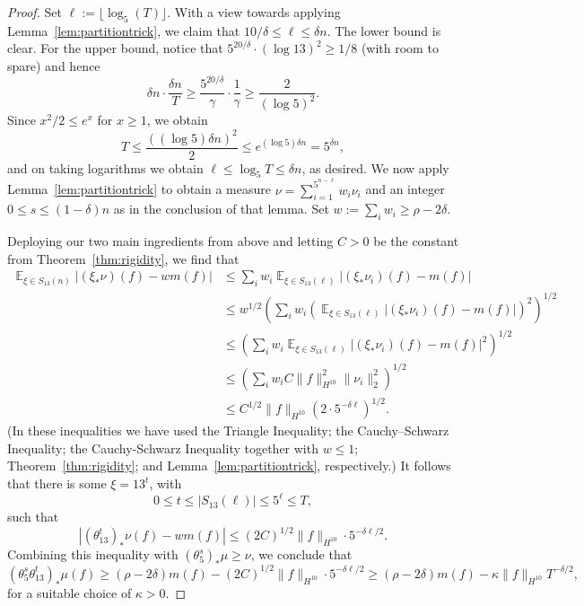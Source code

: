 \documentclass[11pt]{amsart}
\theoremstyle{definition}
\DeclareMathOperator*{\E}{\mathbb{E}}
\begin{document}
\begin{proof}
Set $\ell:=\lfloor \log_5(T) \rfloor$.  With a view towards applying Lemma~\ref{lem:partitiontrick}, we claim that $10/\delta\leq \ell \leq \delta n$.  The lower bound is clear.  For the upper bound, notice that $5^{20/\delta} \cdot (\log 13)^2 \geq 1/8$ (with room to spare) and hence
$$\delta n \cdot \frac{\delta n}{T} \geq \frac{5^{20/\delta}}{\gamma} \cdot \frac{1}{\gamma} \geq \frac{2}{(\log 5)^2}.$$
Since $x^2/2 \leq e^x$ for $x \geq 1$, we obtain
$$T \leq \frac{((\log 5) \delta n)^2}{2} \leq e^{(\log 5) \delta n}=5^{\delta n},$$
and on taking logarithms we obtain $\ell \leq \log_5 T \leq \delta n$, as desired.  We now apply Lemma~\ref{lem:partitiontrick} to obtain a measure $\nu=\sum_{i=1}^{5^{n-\ell}} w_i \nu_i$ and an integer $0 \leq s \leq (1-\delta)n$ as in the conclusion of that lemma.  Set $w:=\sum_i w_i \geq \rho-2\delta$.

Deploying our two main ingredients from above and letting $C>0$ be the constant from Theorem~\ref{thm:rigidity}, we find that
\begin{align*}
\E_{\xi \in S_{13}(n)} |(\xi_* \nu)(f) - wm(f)| &\leq \sum_i w_i \E_{\xi \in S_{13}(\ell)} |(\xi_* \nu_i)(f) - m(f)|\\
 &\leq w^{1/2} \left (\sum_i w_i \left (\E_{\xi \in S_{13}(\ell)} |(\xi_* \nu_i)(f) - m(f)| \right)^2 \right)^{1/2}\\
 & \leq \left (\sum_i w_i \E_{\xi \in S_{13}(\ell)} |(\xi_* \nu_i)(f) - m(f)|^2 \right)^{1/2}\\
 &\leq \left (\sum_i w_i C\|f\|_{H^{10}}^2 \|\nu_i\|_2^2 \right)^{1/2}\\
 & \leq C^{1/2} \|f\|_{H^{10}} \left(2 \cdot 5^{-\delta \ell} \right)^{1/2}.
\end{align*}
(In these inequalities we have used the Triangle Inequality; the Cauchy--Schwarz Inequality; the Cauchy-Schwarz Inequality together with $w \leq 1$; Theorem~\ref{thm:rigidity}; and Lemma~\ref{lem:partitiontrick}, respectively.)  It follows that there is some $\xi=13^t$, with $$0 \leq t \leq |S_{13}(\ell)| \leq 5^\ell \leq T,$$
such that
$$|(\theta_{13}^t)_* \nu(f) - wm(f)| \leq (2C)^{1/2} \|f\|_{H^{10}} \cdot 5^{-\delta \ell/2}.$$
Combining this inequality with $(\theta_5^s)_* \mu \geq \nu$, we conclude that
$$(\theta_5^s \theta_{13}^t)_* \mu(f) \geq (\rho-2\delta)m(f)-(2C)^{1/2} \|f\|_{H^{10}} \cdot 5^{-\delta \ell/2} \geq (\rho-2\delta)m(f)-\kappa \|f\|_{H^{10}} T^{-\delta/2},$$
for a suitable choice of $\kappa>0$.
\end{proof}
\end{document}
